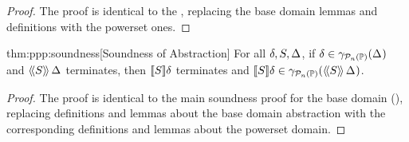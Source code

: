 \begin{proof} The proof is identical to the ,
replacing the base domain lemmas and definitions with the powerset ones.
\end{proof}

\begin{reptheorem}{thm:ppp:soundness}[Soundness of Abstraction]
For all $\delta, S, \Delta_{}$, if $\delta \in \gamma_{\mathcal{P}_{n}\left( \mathbb{P} \right)}(\Delta_{})$ and $
\langle\!\langle{S}\rangle\!\rangle\,{\Delta_{}} $ terminates, then $ [\![{S}]\!]{\delta} $ terminates and
$[\![{S}]\!]{\delta} \in \gamma_{\mathcal{P}_{n}\left( \mathbb{P} \right)}(\langle\!\langle{S}\rangle\!\rangle\,{\Delta_{}})$.
\end{reptheorem}

\begin{proof} The proof is identical to the main soundness proof for
the base domain (), replacing definitions and
lemmas about the base domain abstraction with the corresponding
definitions and lemmas about the powerset domain.
\end{proof}

